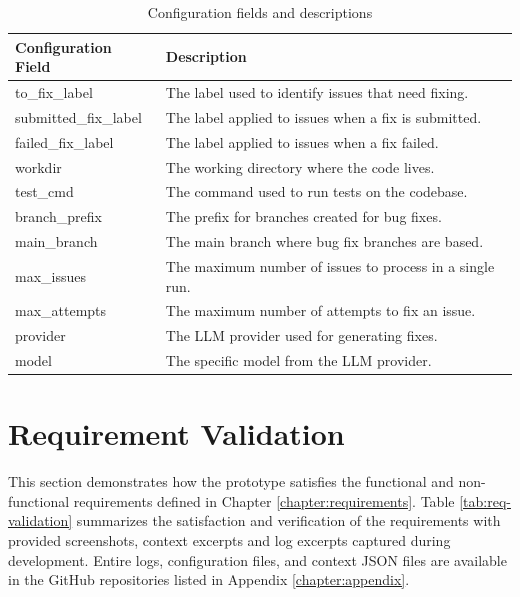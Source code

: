 \renewcommand{\arraystretch}{1.5}
\begin{longtable}{@{\extracolsep{\fill}} p{3.5cm} | p{11cm} @{}}
    \caption{Configuration fields and descriptions} \label{table:configuration}             \\
    \toprule
    \textbf{Configuration Field} & \textbf{Description}                                     \\
    \midrule
    \endfirsthead

    \bottomrule
    \endfoot

    to\_fix\_label               & The label used to identify issues that need fixing.      \\ \hline
    submitted\_fix\_label        & The label applied to issues when a fix is submitted.     \\ \hline
    failed\_fix\_label           & The label applied to issues when a fix failed.           \\ \hline
    workdir                      & The working directory where the code lives.              \\ \hline
    test\_cmd                    & The command used to run tests on the codebase.           \\ \hline
    branch\_prefix               & The prefix for branches created for bug fixes.           \\ \hline
    main\_branch                 & The main branch where bug fix branches are based.        \\ \hline
    max\_issues                  & The maximum number of issues to process in a single run. \\ \hline
    max\_attempts                & The maximum number of attempts to fix an issue.          \\ \hline
    provider                     & The \ac{LLM} provider used for generating fixes.         \\ \hline
    model                        & The specific model from the \ac{LLM} provider.           \\
\end{longtable}


\section{Requirement Validation}

This section demonstrates how the prototype satisfies the functional and non-functional requirements defined in Chapter \ref{chapter:requirements}. Table \ref{tab:req-validation} summarizes the satisfaction and verification of the requirements with provided screenshots, context excerpts and log excerpts captured during development. Entire logs, configuration files, and context JSON files are available in the GitHub repositories listed in Appendix \ref{chapter:appendix}.

